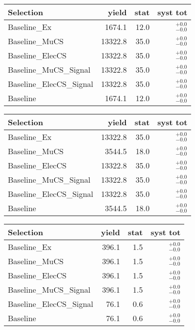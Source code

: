 \begin{tabular}{l|rrr}
\toprule
                 Selection & yield & stat & syst tot   \\ 
\midrule
              Baseline\_Ex & 1674.1 & 12.0 & ${}^{+0.0}_{-0.0}$ \\
            Baseline\_MuCS & 13322.8 & 35.0 & ${}^{+0.0}_{-0.0}$ \\
          Baseline\_ElecCS & 13322.8 & 35.0 & ${}^{+0.0}_{-0.0}$ \\
    Baseline\_MuCS\_Signal & 13322.8 & 35.0 & ${}^{+0.0}_{-0.0}$ \\
  Baseline\_ElecCS\_Signal & 13322.8 & 35.0 & ${}^{+0.0}_{-0.0}$ \\
                  Baseline & 1674.1 & 12.0 & ${}^{+0.0}_{-0.0}$ \\
\bottomrule
\end{tabular}



\begin{tabular}{l|rrr}
\toprule
                 Selection & yield & stat & syst tot   \\ 
\midrule
              Baseline\_Ex & 13322.8 & 35.0 & ${}^{+0.0}_{-0.0}$ \\
            Baseline\_MuCS & 3544.5 & 18.0 & ${}^{+0.0}_{-0.0}$ \\
          Baseline\_ElecCS & 13322.8 & 35.0 & ${}^{+0.0}_{-0.0}$ \\
    Baseline\_MuCS\_Signal & 13322.8 & 35.0 & ${}^{+0.0}_{-0.0}$ \\
  Baseline\_ElecCS\_Signal & 13322.8 & 35.0 & ${}^{+0.0}_{-0.0}$ \\
                  Baseline & 3544.5 & 18.0 & ${}^{+0.0}_{-0.0}$ \\
\bottomrule
\end{tabular}



\begin{tabular}{l|rrr}
\toprule
                 Selection & yield & stat & syst tot   \\ 
\midrule
              Baseline\_Ex & 396.1 & 1.5 & ${}^{+0.0}_{-0.0}$ \\
            Baseline\_MuCS & 396.1 & 1.5 & ${}^{+0.0}_{-0.0}$ \\
          Baseline\_ElecCS & 396.1 & 1.5 & ${}^{+0.0}_{-0.0}$ \\
    Baseline\_MuCS\_Signal & 396.1 & 1.5 & ${}^{+0.0}_{-0.0}$ \\
  Baseline\_ElecCS\_Signal & 76.1 & 0.6 & ${}^{+0.0}_{-0.0}$ \\
                  Baseline & 76.1 & 0.6 & ${}^{+0.0}_{-0.0}$ \\
\bottomrule
\end{tabular}


